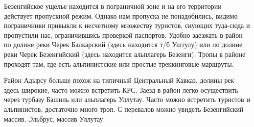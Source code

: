     Безенгийское ущелье находится в пограничной зоне и на его территории действует пропускной режим. Однако нам пропуска не
    понадобились, видимо пограничники привыкли к несчетному множеству туристов, снующих туда-сюда и пропустили нас, ограничившись
    проверкой паспортов. Удобно заезжать в район по долине реки Черек Балкарский (здесь находится т/б Уштулу) или по долине реки
    Черек Безенгийский (здесь находится альплагерь Безенги). Тропы в районе проходят там, где есть альпинистские или простые
    треккинговые маршруты.

    Район Адырсу больше похож на типичный Центральный Кавказ, долины рек здесь широкие, часто можно встретить КРС. Заезд в
    район легко осуществить через турбазу Башиль или альплагерь Уллутау. Часто можно встретить туристов и альпинистов,
    достаточно много троп. С перевалов можно увидеть Безенгийский массив, Эльбрус, массив Уллутау.
